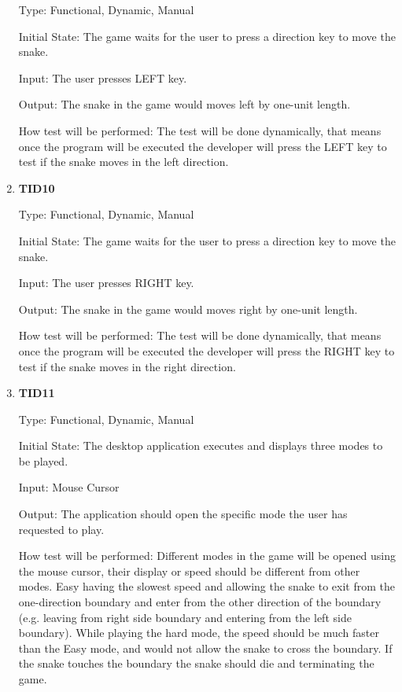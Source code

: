 \documentclass[12pt, titlepage]{article}
\begin{document}
\begin{enumerate}
Type: Functional, Dynamic, Manual 	
					
Initial State: The game waits for the user to press a direction key to move the snake.
					
Input: The user presses LEFT key.
					
Output: The snake in the game would moves left by one-unit length.
					
How test will be performed: The test will be done dynamically, that means once the program will be executed the developer will press the LEFT key to test if the snake moves in the left direction.

\item{\textbf{TID10}\\}

Type: Functional, Dynamic, Manual 	
					
Initial State: The game waits for the user to press a direction key to move the snake.
					
Input: The user presses RIGHT key.
					
Output: The snake in the game would moves right by one-unit length.
					
How test will be performed: The test will be done dynamically, that means once the program will be executed the developer will press the RIGHT key to test if the snake moves in the right direction.

\item{\textbf{TID11}\\}

Type: Functional, Dynamic, Manual

Initial State: The desktop application executes and displays three modes to be played.

Input: Mouse Cursor

Output: The application should open the specific mode the user has requested to play.

How test will be performed: Different modes in the game will be opened using the mouse cursor, their display or speed should be different from other modes. Easy having the slowest speed and allowing the snake to exit from the one-direction boundary and enter from the other direction of the boundary (e.g. leaving from right side boundary and entering from the left side boundary). While playing the hard mode, the speed should be much faster than the Easy mode, and would not allow the snake to cross the boundary. If the snake touches the boundary the snake should die and terminating the game.



\end{enumerate}
\end{document}
